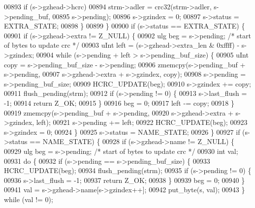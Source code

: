 \begin{DoxyCode}
{00893             \textcolor{keywordflow}{if} (s->gzhead->hcrc)
00894                 strm->adler = crc32(strm->adler, s->pending\_buf,
00895                                     s->pending);
00896             s->gzindex = 0;
00897             s->status = EXTRA\_STATE;
00898         \}
00899     \}
00900     \textcolor{keywordflow}{if} (s->status == EXTRA\_STATE) \{
00901         \textcolor{keywordflow}{if} (s->gzhead->extra != Z\_NULL) \{
00902             ulg beg = s->pending;   \textcolor{comment}{/* start of bytes to update crc */}
00903             uInt left = (s->gzhead->extra\_len & 0xffff) - s->gzindex;
00904             while (s->pending + left > s->pending\_buf\_size) \{
00905                 uInt copy = s->pending\_buf\_size - s->pending;
00906                 zmemcpy(s->pending\_buf + s->pending,
00907                         s->gzhead->extra + s->gzindex, copy);
00908                 s->pending = s->pending\_buf\_size;
00909                 HCRC\_UPDATE(beg);
00910                 s->gzindex += copy;
00911                 flush\_pending(strm);
00912                 \textcolor{keywordflow}{if} (s->pending != 0) \{
00913                     s->last\_flush = -1;
00914                     \textcolor{keywordflow}{return} Z\_OK;
00915                 \}
00916                 beg = 0;
00917                 left -= copy;
00918             \}
00919             zmemcpy(s->pending\_buf + s->pending,
00920                     s->gzhead->extra + s->gzindex, left);
00921             s->pending += left;
00922             HCRC\_UPDATE(beg);
00923             s->gzindex = 0;
00924         \}
00925         s->status = NAME\_STATE;
00926     \}
00927     \textcolor{keywordflow}{if} (s->status == NAME\_STATE) \{
00928         \textcolor{keywordflow}{if} (s->gzhead->name != Z\_NULL) \{
00929             ulg beg = s->pending;   \textcolor{comment}{/* start of bytes to update crc */}
00930             \textcolor{keywordtype}{int} val;
00931             \textcolor{keywordflow}{do} \{
00932                 \textcolor{keywordflow}{if} (s->pending == s->pending\_buf\_size) \{
00933                     HCRC\_UPDATE(beg);
00934                     flush\_pending(strm);
00935                     \textcolor{keywordflow}{if} (s->pending != 0) \{
00936                         s->last\_flush = -1;
00937                         \textcolor{keywordflow}{return} Z\_OK;
00938                     \}
00939                     beg = 0;
00940                 \}
00941                 val = s->gzhead->name[s->gzindex++];
00942                 put\_byte(s, val);
00943             \} \textcolor{keywordflow}{while} (val != 0);
}
\end{DoxyCode}
